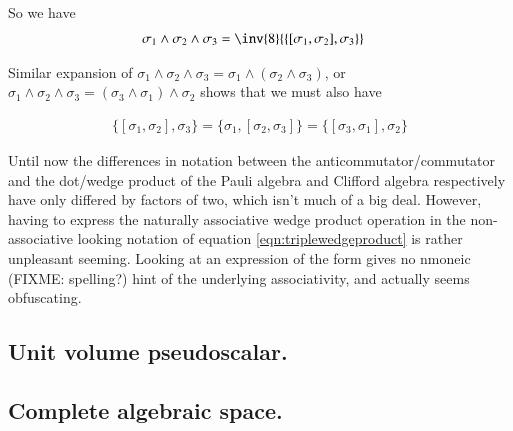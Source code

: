 \documentclass{article}
\newcommand{\symmetric}[2]{{\{{#1},{#2}\}}}
\newcommand{\antisymmetric}[2]{[{#1},{#2}]}
\begin{document}
So we have
\begin{align}\label{eqn:triplewedgeproduct}
\sigma_1 \wedge \sigma_2 \wedge \sigma_3 
&= \inv{8} \symmetric{\antisymmetric{\sigma_1}{\sigma_2}}{\sigma_3}
\end{align}

Similar expansion of $\sigma_1 \wedge \sigma_2 \wedge \sigma_3 = \sigma_1 \wedge (\sigma_2 \wedge \sigma_3)$, or
$\sigma_1 \wedge \sigma_2 \wedge \sigma_3 = (\sigma_3 \wedge \sigma_1) \wedge \sigma_2$
 shows that we must also have

\begin{align}
\symmetric{\antisymmetric{\sigma_1}{\sigma_2}}{\sigma_3}
= \symmetric{\sigma_1}{\antisymmetric{\sigma_2}{\sigma_3}}
= \symmetric{\antisymmetric{\sigma_3}{\sigma_1}}{\sigma_2}
\end{align}

Until now the differences in notation between the anticommutator/commutator and the dot/wedge product of the Pauli algebra and Clifford algebra respectively have only differed by factors of two, which isn't much of a big deal.  However, having to express the naturally associative wedge product operation in the non-associative looking notation of equation \ref{eqn:triplewedgeproduct} is rather unpleasant seeming.  Looking at an expression of the form gives no nmoneic (FIXME: spelling?) hint of the underlying associativity, and actually seems obfuscating.

\subsection{ Unit volume pseudoscalar. }

\subsection{ Complete algebraic space. }




\end{document}

